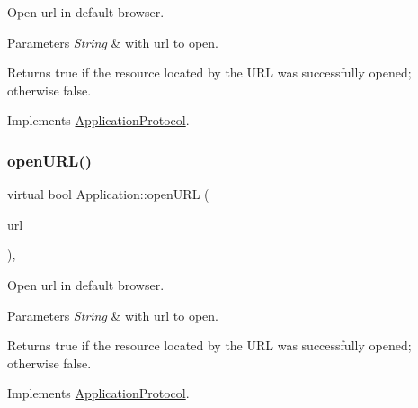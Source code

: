 Open url in default browser. 


\begin{DoxyParams}{Parameters}
{\em String} & with url to open. \\
\hline
\end{DoxyParams}
\begin{DoxyReturn}{Returns}
true if the resource located by the U\+RL was successfully opened; otherwise false. 
\end{DoxyReturn}


Implements \hyperlink{classApplicationProtocol_a152a977b301a90253ec5a6533b2e8e04}{Application\+Protocol}.

\mbox{\label{classApplication_a13ccf5ab932de8a22255b56d085bed59}} 
\subsubsection{\texorpdfstring{open\+U\+R\+L()}{openURL()}\hspace{0.1cm}{\footnotesize\ttfamily [8/12]}}
{\footnotesize\ttfamily virtual bool Application\+::open\+U\+RL (\begin{DoxyParamCaption}\item[{const std\+::string \&}]{url }\end{DoxyParamCaption})\hspace{0.3cm}{\ttfamily [override]}, {\ttfamily [virtual]}}



Open url in default browser. 


\begin{DoxyParams}{Parameters}
{\em String} & with url to open. \\
\hline
\end{DoxyParams}
\begin{DoxyReturn}{Returns}
true if the resource located by the U\+RL was successfully opened; otherwise false. 
\end{DoxyReturn}


Implements \hyperlink{classApplicationProtocol_a152a977b301a90253ec5a6533b2e8e04}{Application\+Protocol}.

\mbox{\label{classApplication_a13ccf5ab932de8a22255b56d085bed59}} 
